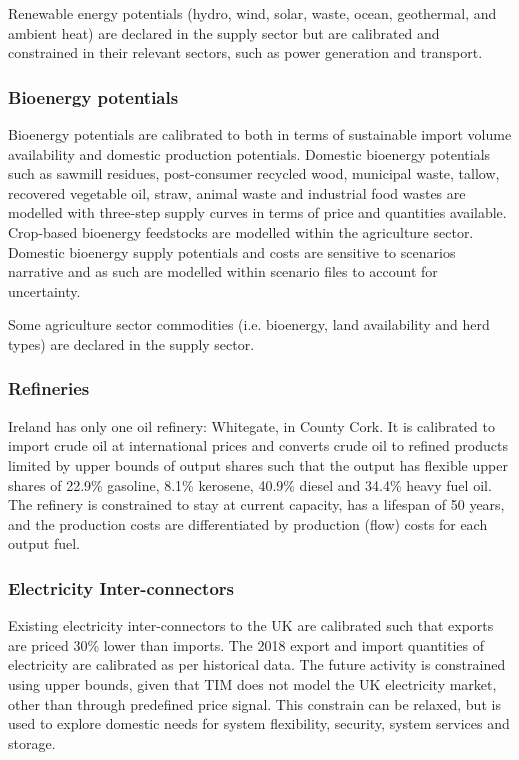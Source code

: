 \documentclass[gmd,manuscript]{copernicus}
\begin{document}
Renewable energy potentials (hydro, wind, solar, waste, ocean, geothermal, and ambient heat) are declared in the supply sector but are calibrated and constrained in their relevant sectors, such as power generation and transport.

\subsubsection{Bioenergy potentials}
Bioenergy potentials are calibrated to \citet{SEAI2015} both in terms of sustainable import volume availability and domestic production potentials. Domestic bioenergy potentials such as sawmill residues, post-consumer recycled wood, municipal waste, tallow, recovered vegetable oil, straw, animal waste and industrial food wastes are modelled with three-step supply curves in terms of price and quantities available. Crop-based bioenergy feedstocks are modelled within the agriculture sector. Domestic bioenergy supply potentials and costs are sensitive to scenarios narrative and as such are modelled within scenario files to account for uncertainty.

Some agriculture sector commodities (i.e. bioenergy, land availability and herd types) are declared in the supply sector.

\subsubsection{Refineries}
Ireland has only one oil refinery: Whitegate, in County Cork. It is calibrated to import crude oil at international prices and converts crude oil to refined products limited by upper bounds of output shares such that the output has flexible upper shares of 22.9\% gasoline, 8.1\% kerosene, 40.9\% diesel and 34.4\% heavy fuel oil. The refinery is constrained to stay at current capacity, has a lifespan of 50 years, and the production costs are differentiated by production (flow) costs for each output fuel.

\subsubsection{Electricity Inter-connectors}
Existing electricity inter-connectors to the UK are calibrated such that exports are priced 30\% lower than imports. The 2018 export and import quantities of electricity are calibrated as per historical data. The future activity is constrained using upper bounds, given that TIM does not model the UK electricity market, other than through predefined price signal. This constrain can be relaxed, but is used to explore domestic needs for system flexibility, security, system services and storage.
\end{document}
